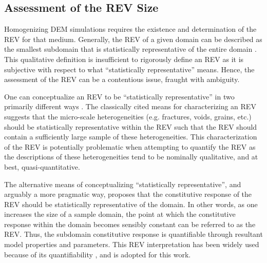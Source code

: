 \subsection{Assessment of the REV Size}

Homogenizing DEM simulations requires the existence and determination of the REV for that medium. Generally, the REV of a given domain can be described as the smallest subdomain that is statistically representative of the entire domain \citep{Kanit_2003, Gitman_2007}. This qualitative definition is insufficient to rigorously define an REV as it is subjective with respect to what “statistically representative” means. Hence, the assessment of the REV can be a contentious issue, fraught with ambiguity.

One can conceptualize an REV to be “statistically representative” in two primarily different ways \citep{Drugan_1996}. The classically cited means for characterizing an REV suggests that the micro-scale heterogeneities (e.g. fractures, voids, grains, etc.) should be statistically representative within the REV such that the REV should contain a sufficiently large sample of these heterogeneities. This characterization of the REV is potentially problematic when attempting to quantify the REV as the descriptions of these heterogeneities tend to be nominally qualitative, and at best, quasi-quantitative.

The alternative means of conceptualizing “statistically representative”, and arguably a more pragmatic way, proposes that the constitutive response of the REV should be statistically representative of the domain. In other words, as one increases the size of a sample domain, the point at which the constitutive response within the domain becomes sensibly constant can be referred to as the REV. Thus, the subdomain constitutive response is quantifiable through resultant model properties and parameters. This REV interpretation has been widely used because of its quantifiability \citep{Kanit_2003, Gitman_2005, Gusev_1997, M_ller_2010}, and is adopted for this work.